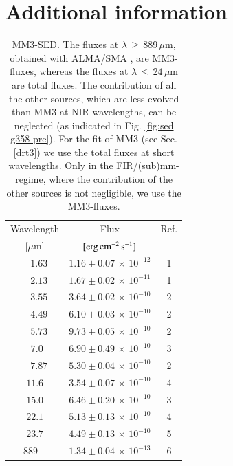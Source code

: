 

\begin{appendix}\label{app}
\section{Additional information}
\begin{table}
\begin{threeparttable}[b]
\caption[]{MM3-SED. The fluxes at $\lambda\,{\ge}\,889\,\mu$m, obtained with ALMA/SMA \citep{2019ApJ...881L..39B}, are MM3-fluxes, whereas the fluxes at $\lambda\,{\le}\,24\,\mu$m are total fluxes. The contribution of all the other sources, which are less evolved than MM3 at NIR wavelengths, can be neglected (as indicated in Fig. \ref{fig:sed g358 pre}). For the fit of MM3 (see Sec. \ref{drt3}) we use the total fluxes at short wavelengths. Only in the FIR/(sub)mm-regime, where the contribution of the other sources is not negligible, we use the MM3-fluxes.}
\label{tab: MM3 SED}
\begin{tabular*}{8.5cm}{@{\hspace{1.25cm}}ccc}
\hline
\noalign{\smallskip}
Wavelength & Flux & Ref.\\
$[\mu$m] & ${[\rm erg \, cm^{-2} \, s^{-1}}]$& \\
\noalign{\smallskip}
\hline
\noalign{\smallskip}
$ ~~~~1.63 $ & $1.16 \pm 0.07\,{\times}\,10^{-12}$  & 1 \\
$ ~~~~2.13 $ & $1.67 \pm 0.02\,{\times}\,10^{-11}$  & 1 \\
$ ~~~~3.55 $ & $3.64 \pm 0.02\,{\times}\,10^{-10}$  & 2 \\
$ ~~~~4.49 $ & $6.10 \pm 0.03\,{\times}\,10^{-10}$  & 2 \\
$ ~~~~5.73 $ & $9.73 \pm 0.05\,{\times}\,10^{-10}$  & 2 \\
$ ~~~7.0~ $ & $6.90 \pm 0.49\,{\times}\,10^{-10}$  & 3 \\
$ ~~~~7.87 $ & $5.30 \pm 0.04\,{\times}\,10^{-10}$  & 2 \\
$ 11.6 $ & $ 3.54 \pm 0.07\,{\times}\,10^{-10}$  & 4 \\
$ 15.0 $ & $ 6.46 \pm 0.20\,{\times}\,10^{-10}$  & 3 \\
$ 22.1 $ & $ 5.13 \pm 0.13\,{\times}\,10^{-10}$  & 4 \\
$ 23.7 $ & $ 4.49 \pm 0.13\,{\times}\,10^{-10}$  & 5 \\
$ 889~~~~ $ & $ 1.34 \pm 0.04\,{\times}\,10^{-13}$  & 6 \\

\end{tabular*}
\end{threeparttable}
\end{table}
\end{appendix}
